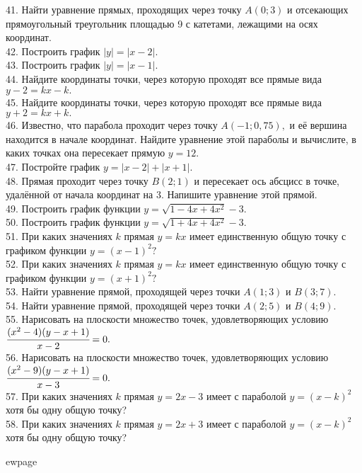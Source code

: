 41. Найти уравнение прямых, проходящих через точку $A(0;3)$ и отсекающих прямоугольный треугольник площадью 9 с катетами, лежащими на осях координат.\\
42. Построить график $|y|=|x-2|.$\\
43. Построить график $|y|=|x-1|.$\\
44. Найдите координаты точки, через которую проходят все прямые вида $y-2=kx-k.$\\
45. Найдите координаты точки, через которую проходят все прямые вида $y+2=kx+k.$\\
46. Известно, что парабола проходит через точку $A(-1;0,75),$ и её вершина находится в начале координат. Найдите уравнение этой параболы и вычислите, в каких точках она пересекает прямую $y=12.$\\
47. Постройте график $y=|x-2|+|x+1|.$\\
48. Прямая проходит через точку $B(2;1)$ и пересекает ось абсцисс в точке, удалённой от начала координат на 3. Напишите уравнение этой прямой.\\
49. Построить график функции $y=\sqrt{1-4x+4x^2}-3.$\\
50. Построить график функции $y=\sqrt{1+4x+4x^2}-3.$\\
51. При каких значениях $k$ прямая $y=kx$ имеет единственную общую точку
с графиком функции $y=(x-1)^2?$\\
52. При каких значениях $k$ прямая $y=kx$ имеет единственную общую точку
с графиком функции $y=(x+1)^2?$\\
53. Найти уравнение прямой, проходящей через точки $A(1;3)$ и $B(3;7).$\\
54. Найти уравнение прямой, проходящей через точки $A(2;5)$ и $B(4;9).$\\
55. Нарисовать на плоскости множество точек, удовлетворяющих условию
$\cfrac{(x^2-4)(y-x+1)}{x-2}=0.$\\
56. Нарисовать на плоскости множество точек, удовлетворяющих условию
$\cfrac{(x^2-9)(y-x+1)}{x-3}=0.$\\
57. При каких значениях $k$ прямая $y=2x-3$ имеет с параболой $y=(x-k)^2$ хотя бы одну общую точку?\\
58. При каких значениях $k$ прямая $y=2x+3$ имеет с параболой $y=(x-k)^2$ хотя бы одну общую точку?

ewpage

